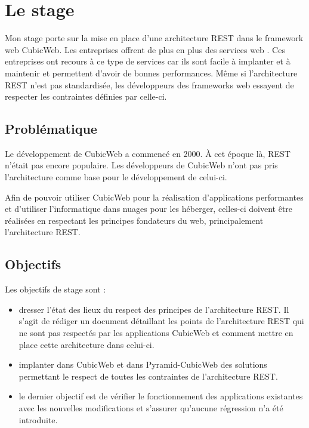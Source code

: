 \chapter{Le stage} 
Mon stage porte sur la mise en place d'une architecture REST dans le framework 
web CubicWeb. Les entreprises offrent de plus en plus des services web 
. Ces entreprises ont recours à ce type de services car ils 
sont facile à implanter et à maintenir et permettent d'avoir de bonnes 
performances. Même si l'architecture REST n'est pas standardisée, les développeurs 
des frameworks web essayent de respecter les contraintes définies par celle-ci.   

\section{Problématique} Le développement de CubicWeb a commencé en 2000. \`A cet 
époque là, REST n'était pas encore populaire. Les développeurs de CubicWeb n'ont 
pas pris l'architecture comme base pour le développement de celui-ci.  

Afin de pouvoir utiliser CubicWeb pour la réalisation d'applications performantes 
et d'utiliser l'informatique dans nuages pour les héberger, celles-ci 
doivent être réalisées en respectant les principes fondateurs du web, principalement 
l'architecture REST.


\section{Objectifs} 
Les objectifs de stage sont : 

\begin{itemize} 
    \item dresser l'état des lieux du respect des principes de l'architecture REST.
        Il s'agit de rédiger un document détaillant les points de l'architecture REST 
        qui ne sont pas respectés par les applications CubicWeb et comment mettre en 
        place cette architecture dans celui-ci.
	
    \item implanter dans CubicWeb et dans Pyramid-CubicWeb des solutions
        permettant le respect de toutes les contraintes de l'architecture REST. 
	
    \item le dernier objectif est de vérifier le fonctionnement des applications 
        existantes avec les nouvelles modifications et s'assurer qu'aucune régression 
        n'a été introduite.  
\end{itemize}
